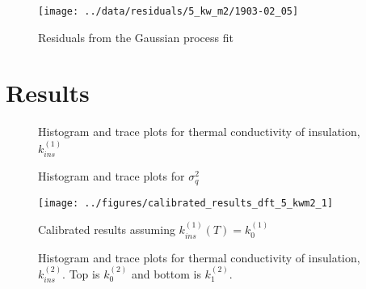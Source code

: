 \documentclass[article]{proc}
\begin{document}
\begin{figure}
    \centering
    \texttt{[image: ../data/residuals/5\_kw\_m2/1903-02\_05]}
    \caption{Residuals from the Gaussian process fit}
    \label{fig:gp_residuals}
\end{figure}

\section{Results}

\begin{figure}[b!]
    \centering
    \qquad
    \caption{Histogram and trace plots for thermal conductivity of insulation, $k^{(1)}_{ins}$}
    \label{fig:param_trace_1}
\end{figure}

\begin{figure}[b!]
    \centering
    \qquad
    \caption{Histogram and trace plots for $\sigma_q^2$}
    \label{fig:sigma_trace_1}
\end{figure}

\begin{figure}
    \centering
    \texttt{[image: ../figures/calibrated\_results\_dft\_5\_kwm2\_1]}
    \caption{Calibrated results assuming $k^{(1)}_{ins}(T) = k^{(1)}_0$}
    \label{fig:cal_results_1}
\end{figure}

\begin{figure}[b!]
    \centering
    \qquad

    \qquad
    \caption{Histogram and trace plots for thermal conductivity of insulation, $k^{(2)}_{ins}$. Top is $k^{(2)}_0$ and bottom is $k^{(2)}_1$.}
    \label{fig:param_trace_2}
\end{figure}
\end{document}
